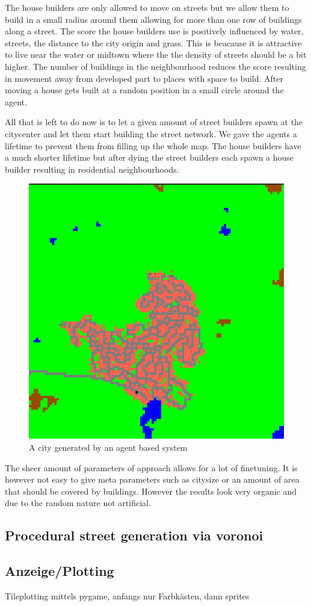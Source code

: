\documentclass{scrartcl}
\begin{document}
The house builders are only allowed to move on streets but we allow them to build
in a small radius around them allowing for more than one row of buildings along a street.
The score the house builders use is positively influenced by water, streets, the
distance to the city origin and grass. This is beacause it is attractive to live
near the water or midtown where the the density of streets should be a bit higher.
The number of buildings in the neighbourhood reduces the score resulting in movement
away from developed part to places with space to build. After moving a house gets built
at a random position in a small circle around the agent.

All that is left to do now is to let a given amount of street builders spawn at the
citycenter and let them start  building the street network. We gave the agents
a lifetime to prevent them from filling up the whole map. The house builders
have a much shorter lifetime but after dying the street builders each  spawn a
house builder resulting in residential neighbourhoods.

\begin{figure}
  \centering
  \includegraphics[scale = 0.2]{city}
  \caption{A city generated by an agent based system}
\end{figure}

The sheer amount of parameters of approach allows for a lot of finetuning.
It is however not easy to give meta parameters such as citysize or an amount
of area that should be covered by buildings. However the results look very organic
and due to the random nature not artificial.

\subsection{Procedural street generation via voronoi}


\subsection{Anzeige/Plotting}
Tileplotting mittels pygame, anfangs nur Farbkästen, dann sprites
\end{document}
